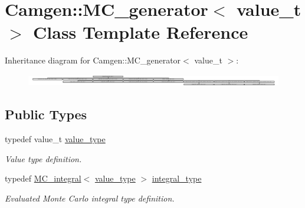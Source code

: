 \hypertarget{a00362}{\section{Camgen\-:\-:M\-C\-\_\-generator$<$ value\-\_\-t $>$ Class Template Reference}
\label{a00362}
}
Inheritance diagram for Camgen\-:\-:M\-C\-\_\-generator$<$ value\-\_\-t $>$\-:\begin{figure}[H]
\begin{center}
\leavevmode
\includegraphics[height=0.517560cm]{a00362}
\end{center}
\end{figure}
\subsection*{Public Types}
\begin{DoxyCompactItemize}
\item 
\hypertarget{a00362_a3353150105036deac9bde097cbf1d8af}{typedef value\-\_\-t \hyperlink{a00362_a3353150105036deac9bde097cbf1d8af}{value\-\_\-type}}\label{a00362_a3353150105036deac9bde097cbf1d8af}

\begin{DoxyCompactList}\small\item\em Value type definition. \end{DoxyCompactList}\item 
\hypertarget{a00362_a235a1a233113c4223e2125db7b42728f}{typedef \hyperlink{a00363}{M\-C\-\_\-integral}$<$ \hyperlink{a00362_a3353150105036deac9bde097cbf1d8af}{value\-\_\-type} $>$ \hyperlink{a00362_a235a1a233113c4223e2125db7b42728f}{integral\-\_\-type}}\label{a00362_a235a1a233113c4223e2125db7b42728f}

\begin{DoxyCompactList}\small\item\em Evaluated Monte Carlo integral type definition. \end{DoxyCompactList}\end{DoxyCompactItemize}

